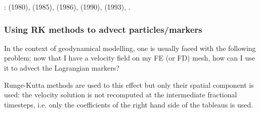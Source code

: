 \Literature:
\textcite{dopr80} (1980),
\textcite{fehl85} (1985),
\textcite{dopr86} (1986),
\textcite{caka90} (1990),
\textcite{hanw93} (1993),
\textcite{butcher03}.


\subsubsection{Using RK methods to advect particles/markers \label{sec:rkparticles}}

In the context of geodynamical modelling, one is usually faced with the following problem:
now that I have a velocity field on my FE (or FD) mesh, how can I use it to advect the Lagrangian 
markers?

Runge-Kutta methods are used to this effect but only their spatial component is used:
the velocity solution is not recomputed at the intermediate fractional timesteps, i.e. 
only the coefficients of the right hand side of the tableaus is used.

